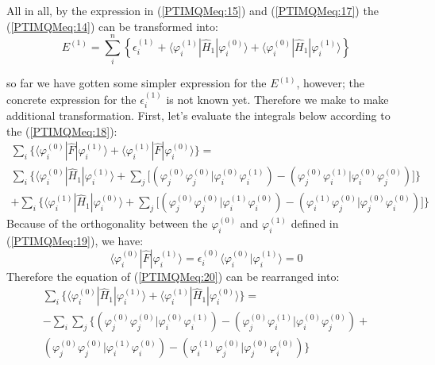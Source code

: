 All in all, by the expression in (\ref{PTIMQMeq:15}) and
(\ref{PTIMQMeq:17}) the (\ref{PTIMQMeq:14}) can be transformed into:
\begin{equation}\label{PTIMQMeq:22}
E^{(1)} =\sum_{i}^{n} \left\{\epsilon^{(1)}_{i} +
\langle\varphi^{(1)}_{i}|\hat{H}_{1}|\varphi^{(0)}_{i}\rangle
      +\langle\varphi^{(0)}_{i}|\hat{H}_{1}|\varphi^{(1)}_{i}\rangle\right\}
\end{equation}

so far we have gotten some simpler expression for the $E^{(1)}$,
however; the concrete expression for the $\epsilon^{(1)}_{i}$ is not
known yet. Therefore we make to make additional transformation.
First, let's evaluate the integrals below according to the
(\ref{PTIMQMeq:18}):
\begin{multline}\label{PTIMQMeq:20}
\sum_{i}\Bigg\{\langle\varphi^{(0)}_{i}|\hat{F}|\varphi^{(1)}_{i}\rangle
+\langle\varphi^{(1)}_{i}|\hat{F}|\varphi^{(0)}_{i}\rangle\Bigg\}
= \\
\sum_{i}\Bigg\{
\langle\varphi^{(0)}_{i}|\hat{H}_{1}|\varphi^{(1)}_{i}\rangle +
\sum_{j}\Big[
\left(\varphi^{(0)}_{j}\varphi^{(0)}_{j}|\varphi^{(0)}_{i}\varphi^{(1)}_{i}\right)
-
\left(\varphi^{(0)}_{j}\varphi^{(1)}_{i}|\varphi^{(0)}_{i}\varphi^{(0)}_{j}\right)
\Big] \Bigg\} \\
+ \sum_{i}\Bigg\{
\langle\varphi^{(1)}_{i}|\hat{H}_{1}|\varphi^{(0)}_{i}\rangle +
\sum_{j}\Big[
\left(\varphi^{(0)}_{j}\varphi^{(0)}_{j}|\varphi^{(1)}_{i}\varphi^{(0)}_{i}\right)
-
\left(\varphi^{(1)}_{i}\varphi^{(0)}_{j}|\varphi^{(0)}_{j}\varphi^{(0)}_{i}\right)
\Big] \Bigg\}
\end{multline}
Because of the orthogonality between the $\varphi^{(0)}_{i}$ and
$\varphi^{(1)}_{i}$ defined in (\ref{PTIMQMeq:19}), we have:
\begin{equation}\label{}
\langle\varphi^{(0)}_{i}|\hat{F}|\varphi^{(1)}_{i}\rangle =
\epsilon^{(0)}_{i}\langle\varphi^{(0)}_{i}|\varphi^{(1)}_{i}\rangle
= 0
\end{equation}
Therefore the equation of (\ref{PTIMQMeq:20}) can be rearranged
into:
\begin{multline}\label{PTIMQMeq:20}
\sum_{i}\Bigg\{
\langle\varphi^{(0)}_{i}|\hat{H}_{1}|\varphi^{(1)}_{i}\rangle +
\langle\varphi^{(1)}_{i}|\hat{H}_{1}|\varphi^{(0)}_{i}\rangle
\Bigg\}= \\
-\sum_{i}\sum_{j}\Bigg\{
\left(\varphi^{(0)}_{j}\varphi^{(0)}_{j}|\varphi^{(0)}_{i}\varphi^{(1)}_{i}\right)
-
\left(\varphi^{(0)}_{j}\varphi^{(1)}_{i}|\varphi^{(0)}_{i}\varphi^{(0)}_{j}\right)
+ \\
\left(\varphi^{(0)}_{j}\varphi^{(0)}_{j}|\varphi^{(1)}_{i}\varphi^{(0)}_{i}\right)
-
\left(\varphi^{(1)}_{i}\varphi^{(0)}_{j}|\varphi^{(0)}_{j}\varphi^{(0)}_{i}\right)
\Bigg\}
\end{multline}
